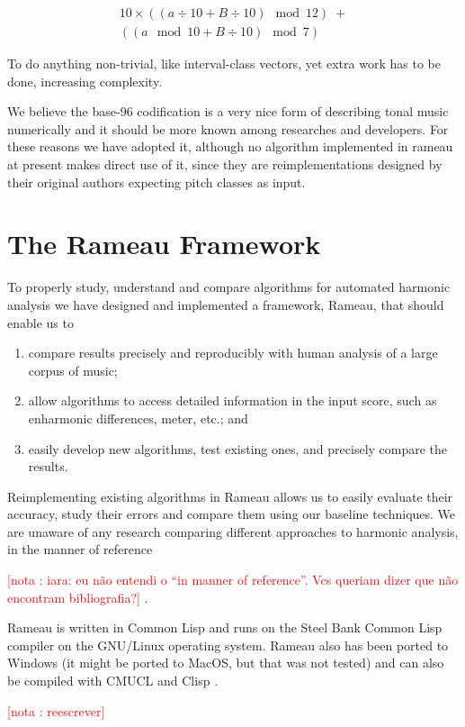 \documentclass{article}
\newcounter{notacounter}
\newcommand{\nota}[1]{
  \addtocounter{notacounter}{1}
  \textcolor{red}{[nota \arabic{notacounter}: #1]}
}
\begin{document}
\begin{eqnarray}
10\times((a \div 10 + B \div 10) \mod 12)\; + \nonumber \\
((a \mod 10 + B \div 10) \mod 7)
\end{eqnarray}

To do anything non-trivial, like interval-class vectors, yet extra
work has to be done, increasing complexity.

We believe the base-96 codification is a very nice form of describing
tonal music numerically and it should be more known among researches
and developers. For these reasons we have adopted it, although no
algorithm implemented in rameau at present makes direct use of it,
since they are reimplementations designed by their original authors
expecting pitch classes as input. 

\section{The Rameau Framework}
\label{sec:system}

To properly study, understand and compare algorithms for automated
harmonic analysis we have designed and implemented a framework,
Rameau, that should enable us to

\begin{enumerate}
\item compare results precisely and reproducibly with human analysis
  of a large corpus of music;
\item allow algorithms to access detailed information in the input score,
  such as enharmonic differences, meter, etc.; and
\item easily develop new algorithms, test existing ones, and precisely
  compare the results.
\end{enumerate}

Reimplementing existing algorithms in Rameau allows us to easily
evaluate their accuracy, study their errors and compare them using our
baseline techniques. We are unaware of any research comparing different
approaches to harmonic analysis, in the manner of reference
\cite{gomez.ea:song} \nota{iara: eu não entendi o ``in manner of
  reference''. Vcs queriam dizer que não encontram bibliografia?}.

Rameau is written in Common Lisp and runs on the Steel Bank Common
Lisp \cite{team:sbcl} compiler on the GNU/Linux operating system.
Rameau also has been ported to Windows (it might be ported to MacOS,
but that was not tested) and can also be compiled with CMUCL
\cite{maclachlan:cmucl} and Clisp \cite{haible.ea:clisp}. \nota{reescrever}
\end{document}
